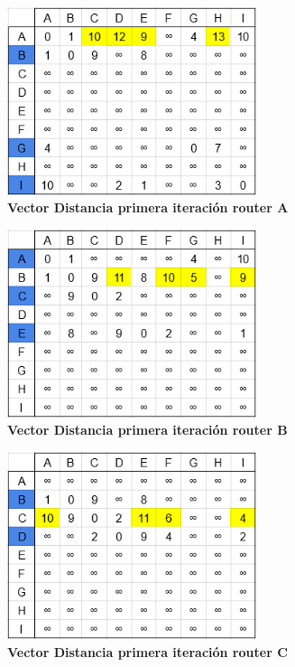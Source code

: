\documentclass[12pt]{article}
\begin{document}
\begin{figure}[H] 
\centering 
\includegraphics[width=0.65\textwidth]{imagenes/2A1.png} \caption{\small \textbf{Vector Distancia primera iteración router A}}
\label{fig:diagrama_17} 
\end{figure}
\begin{figure}[H] 
\centering 
\includegraphics[width=0.65\textwidth]{imagenes/2B1.png} \caption{\small \textbf{Vector Distancia primera iteración router B}}
\label{fig:diagrama_18} 
\end{figure}
\begin{figure}[H] 
\centering 
\includegraphics[width=0.65\textwidth]{imagenes/2C1.png} \caption{\small \textbf{Vector Distancia primera iteración router C}}
\label{fig:diagrama_19} 
\end{figure}
\end{document}
